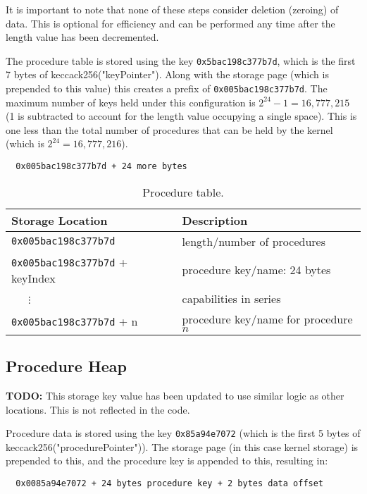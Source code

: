 \documentclass[english,a4paper]{article}
\begin{document}
It is important to note that none of these steps consider deletion (zeroing) of
data. This is optional for efficiency and can be performed any time after the
length value has been decremented.

The procedure table is stored using the key \texttt{0x5bac198c377b7d}, which is
the first 7 bytes of keccack256("keyPointer"). Along with the storage page
(which is prepended to this value) this creates a prefix of
\texttt{0x005bac198c377b7d}. The maximum number of keys held under this
configuration is $2^{24} - 1 = 16,777,215$ (1 is subtracted to account for the
length value occupying a single space). This is one less than the total number
of procedures that can be held by the kernel (which is $2^{24} = 16,777,216$).

\begin{verbatim}
  0x005bac198c377b7d + 24 more bytes
\end{verbatim}

\begin{table}[H]
  \caption{Procedure table.}
  \centering{}%
  \begin{tabular}{l|p{}}
    \hline
    Storage Location & Description\tabularnewline
    \hline
    \hline
    \texttt{0x005bac198c377b7d}     & length/number of procedures
      \tabularnewline
    \texttt{0x005bac198c377b7d} + keyIndex & procedure key/name: 24 bytes
      \tabularnewline
    ~~~$\vdots$ & capabilities in series \tabularnewline
    \texttt{0x005bac198c377b7d} + n & procedure key/name for procedure $n$
      \tabularnewline
    \hline
  \end{tabular}
\end{table}

\subsection{Procedure Heap}\label{procedure-heap}

\textbf{TODO:} This storage key value has been updated to use similar logic as
other locations. This is not reflected in the code.

Procedure data is stored using the key \texttt{0x85a94e7072} (which is the first
5 bytes of keccack256("procedurePointer")). The storage page (in this case
kernel storage) is prepended to this, and the procedure key is appended to this,
resulting in:

\begin{verbatim}
  0x0085a94e7072 + 24 bytes procedure key + 2 bytes data offset
\end{verbatim}
\end{document}
